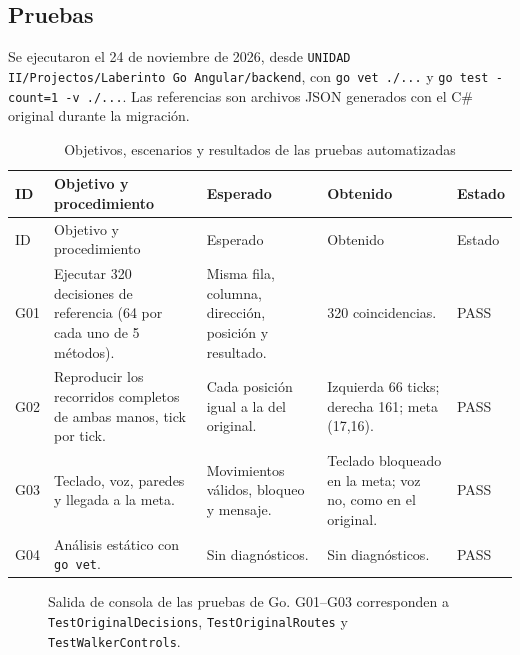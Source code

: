 \documentclass[12pt,a4paper]{article}
\begin{document}
\subsection{Pruebas}
Se ejecutaron el 24 de noviembre de 2026, desde
\texttt{UNIDAD II/Projectos/Laberinto Go Angular/backend}, con
\texttt{go vet ./...} y \texttt{go test -count=1 -v ./...}. Las referencias son
archivos JSON generados con el C\# original durante la migración.

\begin{longtable}{p{1cm}p{3.6cm}p{3.3cm}p{3.2cm}p{1.6cm}}
\caption{Objetivos, escenarios y resultados de las pruebas automatizadas}\\
\toprule ID & Objetivo y procedimiento & Esperado & Obtenido & Estado\\\midrule\endfirsthead
\toprule ID & Objetivo y procedimiento & Esperado & Obtenido & Estado\\\midrule\endhead
G01 & Ejecutar 320 decisiones de referencia (64 por cada uno de 5 métodos). & Misma fila, columna, dirección, posición y resultado. & 320 coincidencias. & PASS\\
G02 & Reproducir los recorridos completos de ambas manos, tick por tick. & Cada posición igual a la del original. & Izquierda 66 ticks; derecha 161; meta (17,16). & PASS\\
G03 & Teclado, voz, paredes y llegada a la meta. & Movimientos válidos, bloqueo y mensaje. & Teclado bloqueado en la meta; voz no, como en el original. & PASS\\
G04 & Análisis estático con \texttt{go vet}. & Sin diagnósticos. & Sin diagnósticos. & PASS\\
\bottomrule
\end{longtable}

\begin{figure}[H]

\caption{Salida de consola de las pruebas de Go. G01--G03 corresponden a \texttt{TestOriginalDecisions}, \texttt{TestOriginalRoutes} y \texttt{TestWalkerControls}.}
\label{fig:consola-pruebas}
\end{figure}
\end{document}
